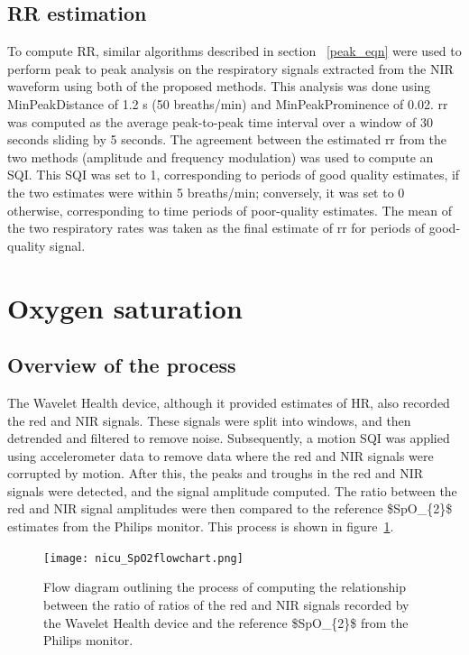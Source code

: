 \subsection{RR estimation}

To compute RR, similar algorithms described in section ~\ref{peak_eqn} were used to perform peak to peak analysis on the respiratory signals extracted from the NIR waveform using both of the proposed methods. This analysis was done using MinPeakDistance of 1.2 s (50 breaths/min) and MinPeakProminence of 0.02. \gls{rr} was computed as the average peak-to-peak time interval over a window of 30 seconds sliding by 5 seconds. The agreement between the estimated \gls{rr} from the two methods (amplitude and frequency modulation) was used to compute an SQI. This SQI was set to 1, corresponding to periods of good quality estimates, if the two estimates were within 5 breaths/min; conversely, it was set to 0 otherwise, corresponding to time periods of poor-quality estimates. The mean of the two respiratory rates was taken as the final estimate of \gls{rr} for periods of good-quality signal.

\section{Oxygen saturation}
\subsection{Overview of the process}

The Wavelet Health device, although it provided estimates of HR, also recorded the red and NIR signals. These signals were split into windows, and then detrended and filtered to remove noise. Subsequently, a motion SQI was applied using accelerometer data to remove data where the red and NIR signals were corrupted by motion. After this, the peaks and troughs in the red and NIR signals were detected, and the signal amplitude computed. The ratio between the red and NIR signal amplitudes were then compared to the reference \gls{$SpO_{2}$} estimates from the Philips monitor. This process is shown in figure~\ref{spo2flow}. 


\begin{figure}
  \centering
    \texttt{[image: nicu\_SpO2flowchart.png]}
    \caption{Flow diagram outlining the process of computing the relationship between the ratio of ratios of the red and NIR signals recorded by the Wavelet Health device and the reference \gls{$SpO_{2}$} from the Philips monitor.}
        \label{spo2flow}
\end{figure}


